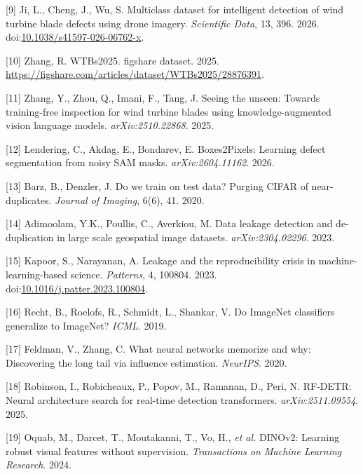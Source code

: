 \documentclass[
  10pt,
]{article}
\newlength{\cslhangindent}
\newenvironment{CSLReferences}[2] %
 {\begin{list}{}{%
  \setlength{\itemindent}{0pt}
  \setlength{\leftmargin}{0pt}
  \setlength{\parsep}{0pt}
  \ifodd #1
   \setlength{\leftmargin}{\cslhangindent}
   \setlength{\itemindent}{-1\cslhangindent}
  \fi
  \setlength{\itemsep}{#2\baselineskip}}}
 {\end{list}}
\begin{document}
\begin{CSLReferences}{0}{0}
{[}9{]} Ji, L., Cheng, J., Wu, S. Multiclass dataset for intelligent
detection of wind turbine blade defects using drone imagery.
\emph{Scientific Data}, 13, 396. 2026.
doi:\href{https://doi.org/10.1038/s41597-026-06762-x}{10.1038/s41597-026-06762-x}.

{[}10{]} Zhang, R. {WTBs2025}. figshare dataset. 2025.
\url{https://figshare.com/articles/dataset/WTBs2025/28876391}.

{[}11{]} Zhang, Y., Zhou, Q., Imani, F., Tang, J. Seeing the unseen:
Towards training-free inspection for wind turbine blades using
knowledge-augmented vision language models. \emph{arXiv:2510.22868}.
2025.

{[}12{]} Lendering, C., Akdag, E., Bondarev, E. {Boxes2Pixels}: Learning
defect segmentation from noisy {SAM} masks. \emph{arXiv:2604.11162}.
2026.

{[}13{]} Barz, B., Denzler, J. Do we train on test data? Purging {CIFAR}
of near-duplicates. \emph{Journal of Imaging}, 6(6), 41. 2020.

{[}14{]} Adimoolam, Y.K., Poullis, C., Averkiou, M. Data leakage
detection and de-duplication in large scale geospatial image datasets.
\emph{arXiv:2304.02296}. 2023.

{[}15{]} Kapoor, S., Narayanan, A. Leakage and the reproducibility
crisis in machine-learning-based science. \emph{Patterns}, 4, 100804.
2023.
doi:\href{https://doi.org/10.1016/j.patter.2023.100804}{10.1016/j.patter.2023.100804}.

{[}16{]} Recht, B., Roelofs, R., Schmidt, L., Shankar, V. Do {ImageNet}
classifiers generalize to {ImageNet}? \emph{ICML}. 2019.

{[}17{]} Feldman, V., Zhang, C. What neural networks memorize and why:
Discovering the long tail via influence estimation. \emph{NeurIPS}.
2020.

{[}18{]} Robinson, I., Robicheaux, P., Popov, M., Ramanan, D., Peri, N.
{RF-DETR}: Neural architecture search for real-time detection
transformers. \emph{arXiv:2511.09554}. 2025.

{[}19{]} Oquab, M., Darcet, T., Moutakanni, T., Vo, H., \emph{et al.}
{DINOv2}: Learning robust visual features without supervision.
\emph{Transactions on Machine Learning Research}. 2024.


\end{CSLReferences}
\end{document}

